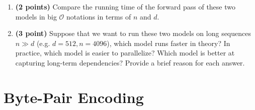 \documentclass[11pt, letterpaper]{article}
\begin{document}
\begin{enumerate}
    \item \textbf{(2 points)} Compare the running time of the forward pass of these two models in big $\mathcal{O}$ notations in terms of $n$ and $d$. 
    
    \item \textbf{(3 point)} Suppose that we want to run these two models on long sequences $n \gg d$ (e.g. $d = 512, n = 4096$), which model runs faster in theory? In practice, which model is easier to parallelize? Which model is better at capturing long-term dependencies? Provide a brief reason for each answer.
\end{enumerate}
    

\newpage

\section{Byte-Pair Encoding}
\end{document}
